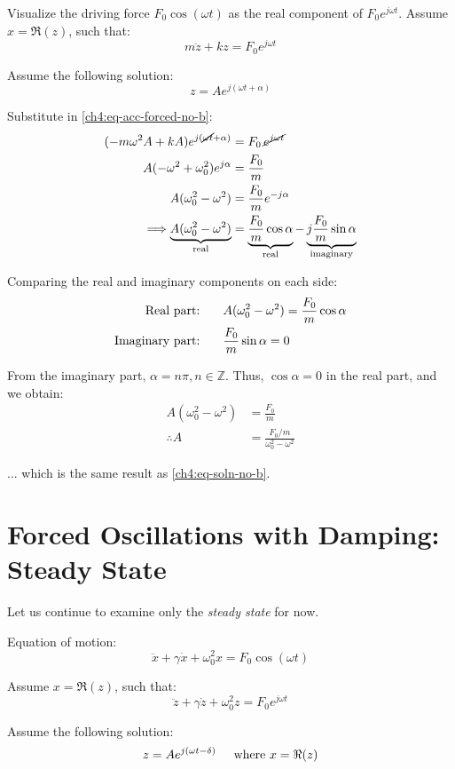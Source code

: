 Visualize the driving force $F_0 \cos(\omega t)$ as the real component of $F_0 e^{j\omega t}$.
Assume $x=\Re(z)$, such that:
\[ m\ddot{z} + kz = F_0 e^{j\omega t}\]

Assume the following solution:
\[z = Ae^{j(\omega t+\alpha)} \]

Substitute in \eqref{ch4:eq-acc-forced-no-b}:
\begin{align*}
	(-m\omega^2 A + kA)e^{j(\cancel{\omega t} + \alpha)} &= F_0 \, \cancel{e^{j\omega t}} \\
	A(-\omega^2 + \omega_0^2)e^{j\alpha} &= \frac{F_0}{m} \\
	A(\omega_0^2 - \omega^2 ) &= \frac{F_0}{m} e^{-j\alpha} \\
	\Longrightarrow
	\underbrace{A(\omega_0^2 - \omega^2 )}_\text{real} &= \underbrace{\frac{F_0}{m} \cos\alpha}_\text{real} - \underbrace{j\frac{F_0}{m} \sin\alpha}_\text{imaginary}
\end{align*}

Comparing the real and imaginary components on each side:
\begin{align*}
	\text{Real part: } \hspace{0.5cm} & A(\omega_0^2 - \omega^2 ) = \frac{F_0}{m} \cos\alpha \\
	\text{Imaginary part: } \hspace{0.5cm} & \frac{F_0}{m} \sin\alpha = 0 
\end{align*}

From the imaginary part, $\alpha = n\pi, n\in\mathbb{Z}$. Thus, $\cos\alpha=0$ in the real part, and we obtain:
\begin{align*}
	A(\omega_0^2 - \omega^2 ) &= \frac{F_0}{m} \\
	\therefore
	A &= \frac{F_0/m}{\omega_0^2 - \omega^2 }
\end{align*}

... which is the same result as \eqref{ch4:eq-soln-no-b}.

\section{Forced Oscillations with Damping: Steady State}	\label{ch4:sec:damping-steady}

Let us continue to examine only the \emph{steady state} for now.

Equation of motion:
\[ \ddot{x} + \gamma\dot{x} + \omega_0^2 x = F_0 \cos(\omega t) \]

Assume $x=\Re(z)$, such that:
\[ \ddot{z} + \gamma\dot{z} + \omega_0^2 z = F_0 e^{j\omega t} \]

Assume the following solution:
\[ z = Ae^{j(\omega t - \delta)} \hspace{0.5cm}\text{where } x=\Re(z)\]

